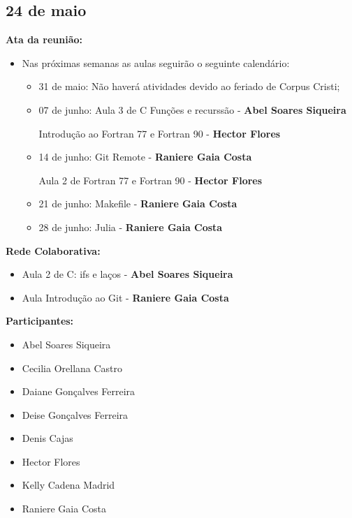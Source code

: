 \documentclass[12pt]{article}
\begin{document}
\subsection{24 de maio}

{\bf Ata da reuni\~ao:}

\begin{itemize}
\item Nas pr\'oximas semanas as aulas seguir\~ao o seguinte calend\'ario:

\begin{itemize}
\item 31 de maio: N\~ao haver\'a atividades devido ao feriado de Corpus Cristi;
\item 07 de junho: Aula 3 de C Fun\c{c}\~oes e recurss\~ao -  {\bf Abel Soares Siqueira}

Introdu\c{c}\~ao ao Fortran 77 e Fortran 90 - {\bf Hector Flores}
\item 14 de junho: Git Remote - {\bf Raniere Gaia Costa }

Aula 2 de Fortran 77 e Fortran 90 - {\bf Hector Flores}
\item 21 de junho: Makefile - {\bf Raniere Gaia Costa}
\item 28 de junho: Julia - {\bf Raniere Gaia Costa}

\end{itemize}
\end{itemize}

{\bf Rede Colaborativa:} 

\begin{itemize}

\item Aula 2 de C: ifs e la\c{c}os - {\bf Abel Soares Siqueira}
\item Aula Introdu\c{c}\~ao ao Git - {\bf Raniere Gaia Costa}
\end{itemize}

{\bf{Participantes:}}

\begin{itemize}
\item Abel Soares Siqueira
\item Cecilia Orellana Castro
\item Daiane Gon\c{c}alves Ferreira
\item Deise Gon\c{c}alves Ferreira
\item Denis Cajas
\item Hector Flores
\item Kelly Cadena Madrid
\item Raniere Gaia Costa
\end{itemize}
\end{document}
